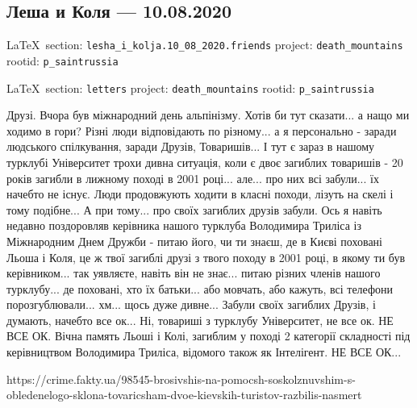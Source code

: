  
 

\subsection{Леша и Коля --- 10.08.2020}
  
\vspace{0.5cm}
 {\ifDEBUG\small\LaTeX~section: \verb|lesha_i_kolja.10_08_2020.friends| project: \verb|death_mountains| rootid: \verb|p_saintrussia| \fi}
\vspace{0.5cm}
  
\vspace{0.5cm}
 {\ifDEBUG\small\LaTeX~section: \verb|letters| project: \verb|death_mountains| rootid: \verb|p_saintrussia| \fi}
\vspace{0.5cm}

Друзі. Вчора був міжнародний день альпінізму. Хотів би тут сказати... а нащо ми
ходимо в гори? Різні люди відповідають по різному... а я персонально - заради
людського спілкування, заради Друзів, Товаришів... І тут є зараз в нашому
турклубі Університет трохи дивна ситуація, коли є двоє загиблих товаришів - 20
років загибли в лижному поході в 2001 році... але... про них всі забули... їх
начебто не існує. Люди продовжують ходити в класні походи, лізуть на скелі і
тому подібне... А при тому... про своїх загиблих друзів забули. Ось я навіть
недавно поздоровляв керівника нашого турклуба Володимира Триліса із Міжнародним
Днем Дружби - питаю його, чи ти знаєш, де в Києві поховані Льоша і Коля, це ж
твої загиблі друзі з твого походу в 2001 році, в якому ти був керівником... так
уявляєте, навіть він не знає... питаю різних членів нашого турклубу... де
поховані, хто їх батьки... або мовчать, або кажуть, всі телефони
порозгублювали... хм... щось дуже дивне... Забули своїх загиблих Друзів, і
думають, начебто все ок... Ні, товариші з турклубу Університет, не все ок. НЕ
ВСЕ ОК. Вічна память Льоші і Колі, загиблим у поході 2 категорії складності під
керівництвом Володимира Триліса, відомого також як Інтелігент. НЕ ВСЕ ОК...

https://crime.fakty.ua/98545-brosivshis-na-pomocsh-soskolznuvshim-s-obledenelogo-sklona-tovaricsham-dvoe-kievskih-turistov-razbilis-nasmert
  

